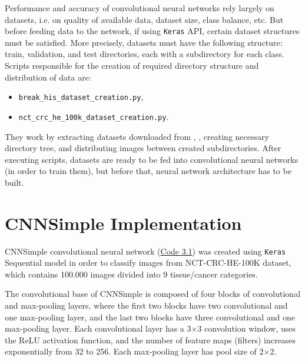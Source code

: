 Performance and accuracy of convolutional neural networks rely largely on datasets, i.e. on quality of available data, dataset size, class balance, etc. But before feeding data to the network, if using \texttt{Keras} API, certain dataset structures must be satisfied. More precisely, datasets must have the following structure: train, validation, and test directories, each with a subdirectory for each class. Scripts responsible for the creation of required directory structure and distribution of data are:
\begin{itemize}
	\itemsep 0em
	\item \texttt{break\_his\_dataset\_creation.py},
	\item \texttt{nct\_crc\_he\_100k\_dataset\_creation.py}.
\end{itemize} 
They work by extracting datasets downloaded from \cite{breakhis_bib}, \cite{nctcrche100k_bib}, creating necessary directory tree, and distributing images between created subdirectories. After executing scripts, datasets are ready to be fed into convolutional neural networks (in order to train them), but before that, neural network architecture has to be built.
\clearpage

\section{CNNSimple Implementation}
\label{cnn}

CNNSimple convolutional neural network (\textcolor{red}{\hyperref[src:py1]{Code 3.1}}) was created using \texttt{Keras} Sequential model in order to classify images from NCT-CRC-HE-100K dataset, which contains 100.000 images divided into 9 tissue/cancer categories. 

The convolutional base of CNNSimple is composed of four blocks of convolutional and max-pooling layers, where the first two blocks have two convolutional and one max-pooling layer, and the last two blocks have three convolutional and one max-pooling layer. Each convolutional layer has a 3$\times$3 convolution window, uses the ReLU activation function, and the number of feature maps (filters) increases exponentially from 32 to 256. Each max-pooling layer has pool size of 2$\times$2. 

